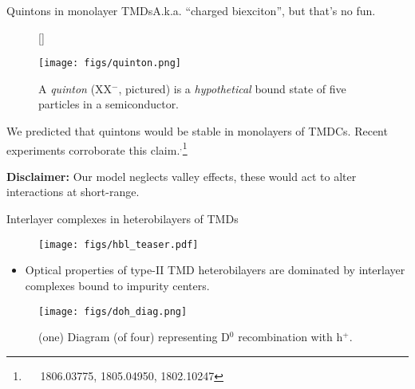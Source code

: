 \documentclass[12pt, pdf, hyperref={draft}, usenames, dvipsnames]{beamer}
\begin{document}
\begin{frame}{Quintons in monolayer TMDs}{A.k.a. ``charged biexciton'', but
that's no fun.}

\begin{figure}[H]
  [\FBwidth]
  {\caption{A \textit{quinton} (XX$^{-}$, pictured) is a
  \textit{hypothetical} bound state of five particles in a
  semiconductor.}\label{fig:quinton}}
  {\texttt{[image: figs/quinton.png]}}
\end{figure}

We predicted that quintons would be stable in monolayers of
TMDCs. Recent experiments corroborate this
claim.$^{,}$\footnote{~~ 1806.03775, 1805.04950,
1802.10247}

{\bf Disclaimer:} Our model neglects valley effects, these would act to
alter interactions at short-range.

\end{frame}

\begin{frame}{Interlayer complexes in heterobilayers of
TMDs}

\begin{minipage}[t]{0.24\textwidth}
\begin{figure}[H]
  \centering
  \texttt{[image: figs/hbl\_teaser.pdf]}
\end{figure}
\end{minipage}%
\hfill
\begin{minipage}[t]{0.74\textwidth}
\begin{itemize}
  \item Optical properties of type-II TMD heterobilayers are dominated by
  interlayer complexes bound to impurity centers.
\end{itemize}

\begin{figure}[H]
  \centering
  \texttt{[image: figs/doh\_diag.png]}
  \caption{(one) Diagram (of four) representing D$^{0}$ recombination with
  h$^{+}$.}
\end{figure}

\end{minipage}%

\end{frame}
\end{document}

